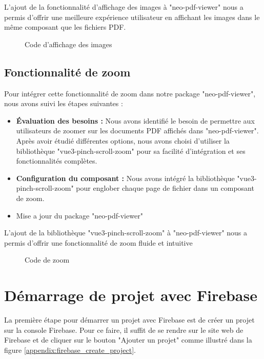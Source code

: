 L'ajout de la fonctionnalité d'affichage des images à "neo-pdf-viewer" nous a permis d'offrir une meilleure expérience utilisateur en affichant les images dans le même composant que les fichiers PDF.

\begin{figure}[H]
    \centering
    \caption{Code d'affichage des images}
    \label{appendix:codedisplayimage}
\end{figure}

\subsection{Fonctionnalité de zoom}

Pour intégrer cette fonctionnalité de zoom dans notre package "neo-pdf-viewer", nous avons suivi les étapes suivantes :
\begin{itemize}
    \item \textbf{Évaluation des besoins :} Nous avons identifié le besoin de permettre aux utilisateurs de zoomer sur les documents PDF affichés dans "neo-pdf-viewer". Après avoir étudié différentes options, nous avons choisi d'utiliser la bibliothèque "vue3-pinch-scroll-zoom" pour sa facilité d'intégration et ses fonctionnalités complètes.
    \item \textbf{Configuration du composant :} Nous avons intégré la bibliothèque "vue3-pinch-scroll-zoom" pour englober chaque page de fichier dans un composant de zoom. 
    \item Mise a jour du package "neo-pdf-viewer" 
\end{itemize}

L'ajout de la bibliothèque "vue3-pinch-scroll-zoom" à "neo-pdf-viewer" nous a permis d'offrir une fonctionnalité de zoom fluide et intuitive

\begin{figure}[H]
    \centering
    \caption{Code de zoom}
    \label{appendix:zoom_code}
\end{figure}


\section{Démarrage de projet avec Firebase}
\label{appendix:firebase_cloud_messaging}

La première étape pour démarrer un projet avec Firebase est de créer un projet sur la console Firebase. Pour ce faire, il suffit de se rendre sur le site web de Firebase et de cliquer sur le bouton "Ajouter un projet" comme illustré dans la figure \ref{appendix:firebase_create_project}.


